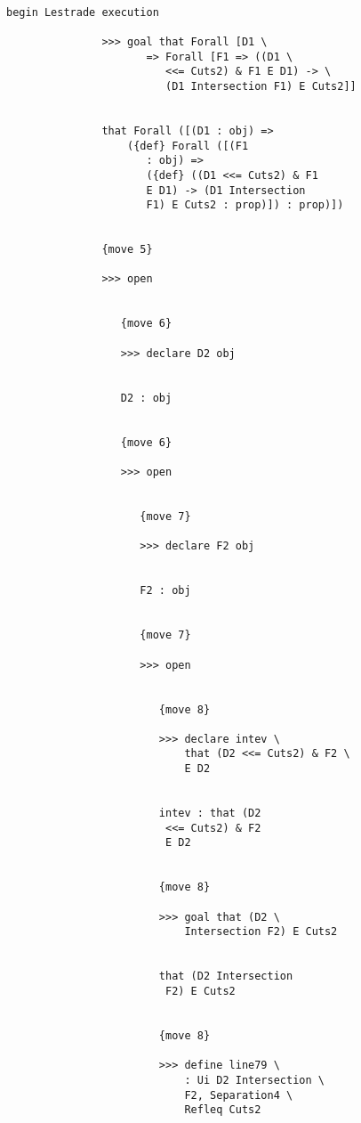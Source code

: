 \documentclass[12pt]{article}
\begin{document}
\begin{verbatim}

begin Lestrade execution

               >>> goal that Forall [D1 \
                      => Forall [F1 => ((D1 \
                         <<= Cuts2) & F1 E D1) -> \
                         (D1 Intersection F1) E Cuts2]]


               that Forall ([(D1 : obj) => 
                   ({def} Forall ([(F1 
                      : obj) => 
                      ({def} ((D1 <<= Cuts2) & F1 
                      E D1) -> (D1 Intersection 
                      F1) E Cuts2 : prop)]) : prop)])


               {move 5}

               >>> open


                  {move 6}

                  >>> declare D2 obj


                  D2 : obj


                  {move 6}

                  >>> open


                     {move 7}

                     >>> declare F2 obj


                     F2 : obj


                     {move 7}

                     >>> open


                        {move 8}

                        >>> declare intev \
                            that (D2 <<= Cuts2) & F2 \
                            E D2


                        intev : that (D2 
                         <<= Cuts2) & F2 
                         E D2


                        {move 8}

                        >>> goal that (D2 \
                            Intersection F2) E Cuts2


                        that (D2 Intersection 
                         F2) E Cuts2


                        {move 8}

                        >>> define line79 \
                            : Ui D2 Intersection \
                            F2, Separation4 \
                            Refleq Cuts2



\end{verbatim}
\end{document}
